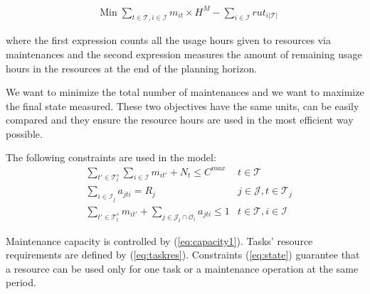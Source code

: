 \documentclass[a4paper,onecolumn,fleqn]{article}
\begin{document}
    \begin{align}
        & \text{Min}\; \sum_{t \in \mathcal{T}, i \in \mathcal{I}} m_{it} \times H^{M} - \sum_{i \in \mathcal{I}} rut_{i|\mathcal{T}|}
    \end{align}
    
    where the first expression counts all the usage hours given to resources via maintenances and the second expression measures the amount of remaining usage hours in the resources at the end of the planning horizon.

    We want to minimize the total number of maintenances and we want to maximize the final state measured. These two objectives have the same units, can be easily compared and they ensure the resource hours are used in the most efficient way possible.

    The following constraints are used in the model:       
    \begin{align}
        & \sum_{t' \in \mathcal{T}^{s}_t} \sum_{i \in \mathcal{I}} m_{it'} + N_t \leq C^{max}
          & t \in \mathcal{T} \label{eq:capacity1}\\
        & \sum_{i \in \mathcal{I}_j} a_{jti} = R_j
                & j \in \mathcal{J}, t \in \mathcal{T}_j  \label{eq:taskres}\\
        & \sum_{t' \in \mathcal{T}^{s}_t} m_{it'} + \sum_{j \in \mathcal{J}_t \cap \mathcal{O}_i} a_{jti} \leq 1 
                & t \in \mathcal{T}, i \in \mathcal{I} \label{eq:state}
    \end{align}


    Maintenance capacity is controlled by (\ref{eq:capacity1}). Tasks' resource requirements are defined by (\ref{eq:taskres}). Constraints (\ref{eq:state}) guarantee that a resource can be used only for one task or a maintenance operation at the same period.  
\end{document}
